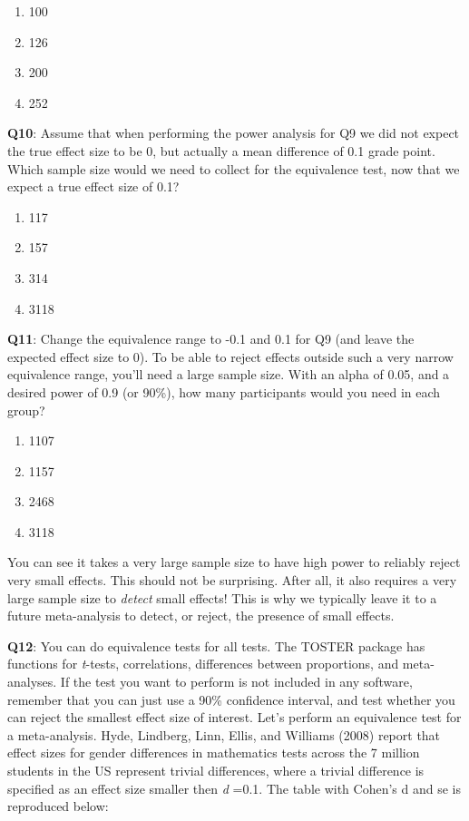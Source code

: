 \documentclass[
  oneside]{book}
\providecommand{\tightlist}{%
  \setlength{\itemsep}{0pt}\setlength{\parskip}{0pt}}
\begin{document}
\begin{enumerate}
\def\labelenumi{\Alph{enumi})}
\tightlist
\item
  100
\item
  126
\item
  200
\item
  252
\end{enumerate}

\textbf{Q10}: Assume that when performing the power analysis for Q9 we did not expect the true effect size to be 0, but actually a mean difference of 0.1 grade point. Which sample size would we need to collect for the equivalence test, now that we expect a true effect size of 0.1?

\begin{enumerate}
\def\labelenumi{\Alph{enumi})}
\tightlist
\item
  117
\item
  157
\item
  314
\item
  3118
\end{enumerate}

\textbf{Q11}: Change the equivalence range to -0.1 and 0.1 for Q9 (and leave the expected effect size to 0). To be able to reject effects outside such a very narrow equivalence range, you'll need a large sample size. With an alpha of 0.05, and a desired power of 0.9 (or 90\%), how many participants would you need in each group?

\begin{enumerate}
\def\labelenumi{\Alph{enumi})}
\tightlist
\item
  1107
\item
  1157
\item
  2468
\item
  3118
\end{enumerate}

You can see it takes a very large sample size to have high power to reliably reject very small effects. This should not be surprising. After all, it also requires a very large sample size to \emph{detect} small effects! This is why we typically leave it to a future meta-analysis to detect, or reject, the presence of small effects.

\textbf{Q12}: You can do equivalence tests for all tests. The TOSTER package has functions for \emph{t}-tests, correlations, differences between proportions, and meta-analyses. If the test you want to perform is not included in any software, remember that you can just use a 90\% confidence interval, and test whether you can reject the smallest effect size of interest. Let's perform an equivalence test for a meta-analysis. Hyde, Lindberg, Linn, Ellis, and Williams (2008) report that effect sizes for gender differences
in mathematics tests across the 7 million students in the US represent trivial differences, where a trivial difference is specified as an effect size smaller then \emph{d} =0.1. The table with Cohen's d and se is reproduced below:
\end{document}
